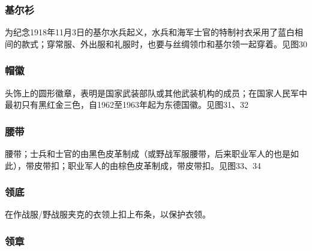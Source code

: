 \subsubsection*{基尔衫}%

为纪念1918年11月3日的基尔水兵起义，水兵和海军士官的特制衬衣采用了蓝白相间的款式；穿常服、外出服和礼服时，也要与丝绸领巾和基尔领一起穿着。见图30

\subsubsection*{帽徽}%

头饰上的圆形徽章，表明是国家武装部队或其他武装机构的成员；在国家人民军中最初只有黑红金三色，自1962至1963年起为东德国徽。见图31、32

\subsubsection*{腰带}%

腰带；士兵和士官的由黑色皮革制成（或野战军服腰带，后来职业军人的也是如此），带皮带扣；职业军人的由棕色皮革制成，带皮带扣。见图33、34

\subsubsection*{领底}%

在作战服/野战服夹克的衣领上扣上布条，以保护衣领。

\subsubsection*{领章}%

